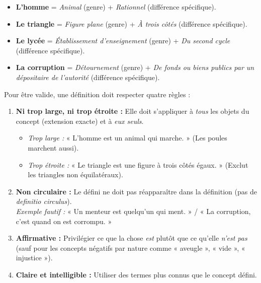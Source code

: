 \documentclass[11pt]{article}
\begin{document}
\begin{exemplebox}
\begin{itemize}
    \item \textbf{L'homme} = \textit{Animal} (genre) + \textit{Rationnel} (différence spécifique).
    \item \textbf{Le triangle} = \textit{Figure plane} (genre) + \textit{À trois côtés} (différence spécifique).
    \item \textbf{Le lycée} = \textit{Établissement d'enseignement} (genre) + \textit{Du second cycle} (différence spécifique).
    \item \textbf{La corruption} = \textit{Détournement} (genre) + \textit{De fonds ou biens publics par un dépositaire de l'autorité} (différence spécifique).
\end{itemize}
\end{exemplebox}

\begin{propriete}
Pour être valide, une définition doit respecter quatre règles :
\begin{enumerate}
    \item \textbf{Ni trop large, ni trop étroite :} Elle doit s'appliquer à \emph{tous} les objets du concept (extension exacte) et à \emph{eux seuls}.
        \begin{itemize}
            \item \emph{Trop large :} « L'homme est un animal qui marche. » (Les poules marchent aussi).
            \item \emph{Trop étroite :} « Le triangle est une figure à trois côtés égaux. » (Exclut les triangles non équilatéraux).
        \end{itemize}
    \item \textbf{Non circulaire :} Le défini ne doit pas réapparaître dans la définition (pas de \textit{definitio circulus}).
        \\ \emph{Exemple fautif :} « Un menteur est quelqu'un qui ment. » / « La corruption, c'est quand on est corrompu. »
    \item \textbf{Affirmative :} Privilégier ce que la chose \emph{est} plutôt que ce qu'elle \emph{n'est pas} (sauf pour les concepts négatifs par nature comme « aveugle », « vide », « injustice »).
    \item \textbf{Claire et intelligible :} Utiliser des termes plus connus que le concept défini.
\end{enumerate}
\end{propriete}
\end{document}
